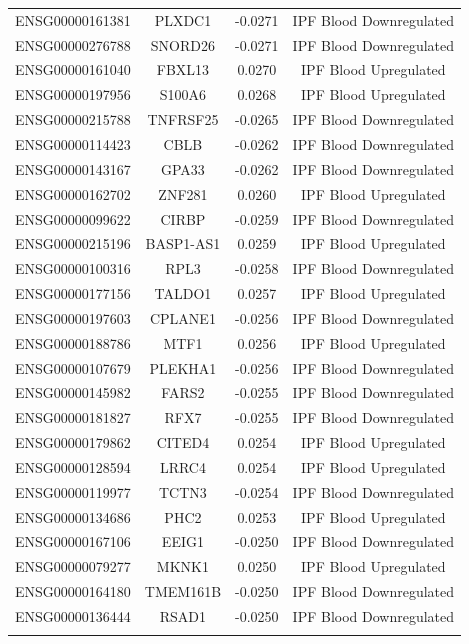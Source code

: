 \documentclass[
]{article}
\begin{document}
\begin{singlespace}
\begin{longtable}[t]{lccc}
ENSG00000161381 & PLXDC1 & -0.0271 & IPF Blood Downregulated\\
ENSG00000276788 & SNORD26 & -0.0271 & IPF Blood Downregulated\\
ENSG00000161040 & FBXL13 & 0.0270 & IPF Blood Upregulated\\
ENSG00000197956 & S100A6 & 0.0268 & IPF Blood Upregulated\\
ENSG00000215788 & TNFRSF25 & -0.0265 & IPF Blood Downregulated\\
\addlinespace
ENSG00000114423 & CBLB & -0.0262 & IPF Blood Downregulated\\
ENSG00000143167 & GPA33 & -0.0262 & IPF Blood Downregulated\\
ENSG00000162702 & ZNF281 & 0.0260 & IPF Blood Upregulated\\
ENSG00000099622 & CIRBP & -0.0259 & IPF Blood Downregulated\\
ENSG00000215196 & BASP1-AS1 & 0.0259 & IPF Blood Upregulated\\
\addlinespace
ENSG00000100316 & RPL3 & -0.0258 & IPF Blood Downregulated\\
ENSG00000177156 & TALDO1 & 0.0257 & IPF Blood Upregulated\\
ENSG00000197603 & CPLANE1 & -0.0256 & IPF Blood Downregulated\\
ENSG00000188786 & MTF1 & 0.0256 & IPF Blood Upregulated\\
ENSG00000107679 & PLEKHA1 & -0.0256 & IPF Blood Downregulated\\
\addlinespace
ENSG00000145982 & FARS2 & -0.0255 & IPF Blood Downregulated\\
ENSG00000181827 & RFX7 & -0.0255 & IPF Blood Downregulated\\
ENSG00000179862 & CITED4 & 0.0254 & IPF Blood Upregulated\\
ENSG00000128594 & LRRC4 & 0.0254 & IPF Blood Upregulated\\
ENSG00000119977 & TCTN3 & -0.0254 & IPF Blood Downregulated\\
\addlinespace
ENSG00000134686 & PHC2 & 0.0253 & IPF Blood Upregulated\\
ENSG00000167106 & EEIG1 & -0.0250 & IPF Blood Downregulated\\
ENSG00000079277 & MKNK1 & 0.0250 & IPF Blood Upregulated\\
ENSG00000164180 & TMEM161B & -0.0250 & IPF Blood Downregulated\\
ENSG00000136444 & RSAD1 & -0.0250 & IPF Blood Downregulated\\
\addlinespace

\end{longtable}
\end{singlespace}
\end{document}
